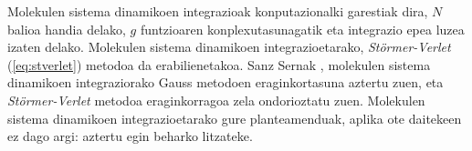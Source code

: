 Molekulen sistema dinamikoen integrazioak konputazionalki garestiak dira, $N$ balioa handia delako, $g$ funtzioaren konplexutasunagatik eta integrazio epea luzea izaten delako. Molekulen sistema dinamikoen integrazioetarako, \emph{Störmer-Verlet} (\ref{eq:stverlet}) metodoa da erabilienetakoa. Sanz Sernak \cite{sserna1996}, molekulen sistema dinamikoen integraziorako Gauss metodoen eraginkortasuna aztertu zuen, eta \emph{Störmer-Verlet} metodoa eraginkorragoa zela ondorioztatu zuen. Molekulen sistema dinamikoen integrazioetarako gure planteamenduak, aplika ote daitekeen ez dago argi: aztertu egin beharko litzateke.




